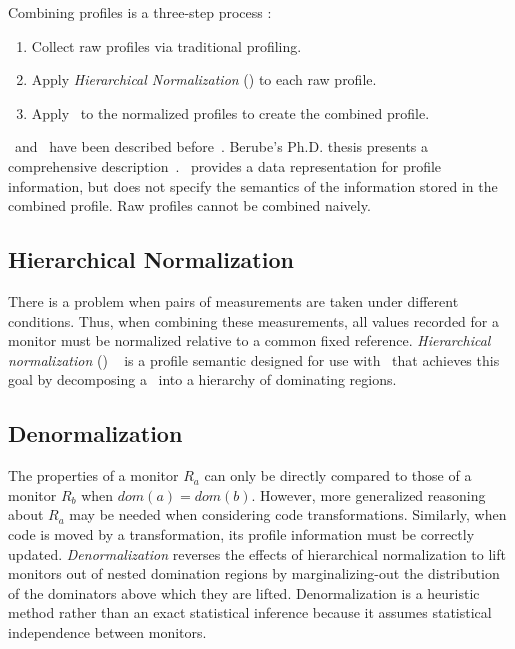Combining profiles is a three-step process \cite{BerubeISPASS12}:
\begin{enumerate}
\item Collect raw profiles via traditional profiling.
\item Apply {\em Hierarchical Normalization} (\HN) to each raw profile. 
\item Apply \CP\ to the normalized profiles to create the combined profile.
\end{enumerate}

\CP\ and \HN\ have been described before~\cite{BerubeICPE11,BerubeISPASS12}. Berube's Ph.D. thesis presents a comprehensive description~\cite{BerubePhD}.
\CP\ provides a data representation for profile information, but does
not specify the semantics of the information stored in the combined
profile.  Raw profiles cannot be combined naively. 

\subsection{Hierarchical Normalization}
\label{cp:hn}

There is a problem when pairs of measurements are taken under different
conditions.  Thus, when
combining these measurements, all values recorded for a monitor must
be normalized relative to a common fixed reference.  {\em Hierarchical
  normalization} (\HN) ~\cite{BerubePhD} is a profile semantic designed for use with
\CP\ that achieves this goal by decomposing a \CFG\ into a hierarchy
of dominating regions.


\subsection{Denormalization}
\label{cp:denorm}

The properties of a monitor $R_a$ can only be directly compared to
those of a monitor $R_b$ when $dom(a) = dom(b)$.  However, more
generalized reasoning about $R_a$ may be needed when considering code
transformations.  Similarly, when code is moved by a transformation,
its profile information must be correctly updated. {\it
  Denormalization} reverses the effects of hierarchical normalization
to lift monitors out of nested domination regions by marginalizing-out
the distribution of the dominators above which they are lifted.
Denormalization is a heuristic method rather than an exact statistical
inference because it assumes statistical independence between monitors.


